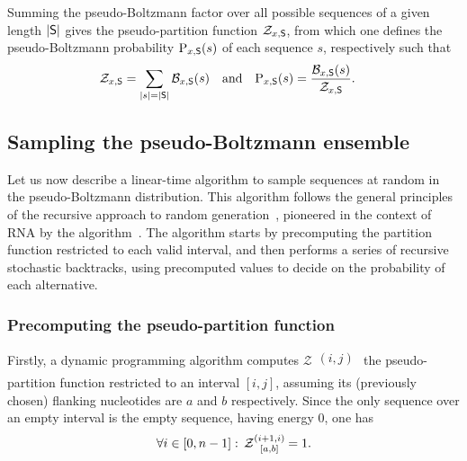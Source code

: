 Summing the pseudo-Boltzmann factor over all possible sequences of a given length $|\text{\sf S}|$ gives the pseudo-partition function $\mathcal{Z}_{x,\text{\sf S}}$, from which one defines the pseudo-Boltzmann probability $\text{P}_{x,\text{\sf S}}(s)$ of each sequence $s$, respectively such that 
\begin{align}\mathcal{Z}_{x,\text{\sf S}} &= \sum_{\substack{|s|=|\text{\sf S}|}}\mathcal{B}_{x,\text{\sf S}}(s)& \text{and}&&
\text{P}_{x,\text{\sf S}}(s) &= \frac{\mathcal{B}_{x,\text{\sf S}}(s)}{\mathcal{Z}_{x,\text{\sf S}}}.\label{def:distribution}\end{align}

\subsection{Sampling the pseudo-Boltzmann ensemble}

Let us now describe a linear-time algorithm to sample sequences at random in the pseudo-Boltzmann distribution. This algorithm follows the general principles of the recursive approach to random generation~\cite{Wilf1977}, pioneered in the context of RNA by the \SFold algorithm~\cite{Ding2003}. The algorithm starts by precomputing the partition function restricted to each valid interval, and then performs a series of recursive stochastic backtracks, using precomputed values to decide on the probability of each alternative.

\subsubsection{Precomputing the pseudo-partition function}\label{sec:pf}
Firstly, a dynamic programming algorithm computes $\mathcal{Z}\substack{(i,j)\\ [a,b]}$ the pseudo-partition function restricted to an interval $[i,j]$, assuming its (previously chosen) flanking nucleotides are $a$ and $b$ respectively. 
Since the only sequence over an empty interval is the empty sequence, having energy $0$, one has
\begin{equation}
	\forall i \in [0,n-1]:\, \Z{i+1,i}{a,b}=1.
	\label{eq:Z_in}
\end{equation}


